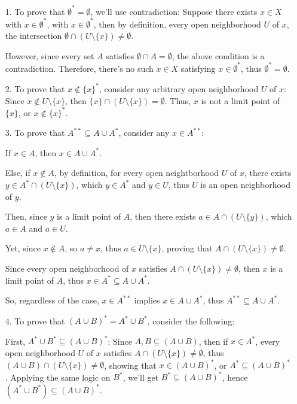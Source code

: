 \documentclass{article}
\begin{document}
\begin{itemize}
    \item[1.] To prove that $\emptyset^*=\emptyset$, we'll use contradiction: Suppose there exists $x\in X$ with $x\in \emptyset^*$, with $x\in \emptyset^*$,
    then by definition, every open neighborhood $U$ of $x$, the intersection $\emptyset \cap (U\setminus \{x\})\neq \emptyset$.

    However, since every set $A$ satisfies $\emptyset \cap A=\emptyset$, the above condition is a contradiction. Therefore, there's no such $x\in X$ satisfying $x\in\emptyset^*$,
    thus $\emptyset^*=\emptyset$.

    \hfill

    \item[2.] To prove that $x\notin\{x\}^*$, consider any arbitrary open neighborhood $U$ of $x$: Since $x\notin U\setminus\{x\}$, 
    then $\{x\}\cap (U\setminus \{x\})=\emptyset$. Thus, $x$ is not a limit point of $\{x\}$, or $x\notin \{x\}^*$.

    \hfill

    \item[3.] To prove that $A^{**}\subseteq A\cup A^*$, consider any $x\in A^{**}$:
    
    If $x\in A$, then $x\in A\cup A^*$.

    Else, if $x\notin A$, by definition, for every open neightborhood $U$ of $x$, there exists $y\in A^*\cap (U\setminus\{x\})$, 
    which $y\in A^*$ and $y\in U$, thus $U$ is an open neighborhood of $y$.

    Then, since $y$ is a limit point of $A$, then there exists $a\in A\cap (U\setminus \{y\})$, which $a\in A$ and $a\in U$.

    Yet, since $x\notin A$, so $a\neq x$, thus $a\in U\setminus \{x\}$, proving that $A\cap (U\setminus\{x\})\neq \emptyset$.

    Since every open neighborhood of $x$ satisfies $A\cap (U\setminus\{x\})\neq \emptyset$, then $x$ is a limit point of $A$, thus $x\in A^*\subseteq A\cup A^*$.

    So, regardless of the case, $x\in A^{**}$ implies $x\in A\cup A^*$, thus $A^{**}\subseteq A\cup A^*$.

    \hfill

    \item[4.] To prove that $(A\cup B)^* = A^*\cup B^*$, consider the following:
    
    First, $A^*\cup B^*\subseteq (A\cup B)^*$: Since $A,B\subseteq (A\cup B)$, then if $x\in A^*$, every open neighborhood $U$ of $x$ satisfies $A\cap (U\setminus\{x\})\neq \emptyset$,
    thus $(A\cup B)\cap (U\setminus\{x\})\neq \emptyset$, showing that $x\in (A\cup B)^*$, or $A^*\subseteq (A\cup B)^*$. 
    Applying the same logic on $B^*$, we'll get $B^*\subseteq (A\cup B)^*$, hence $(A^*\cup B^*)\subseteq (A\cup B)^*$.


\end{itemize}
\end{document}

